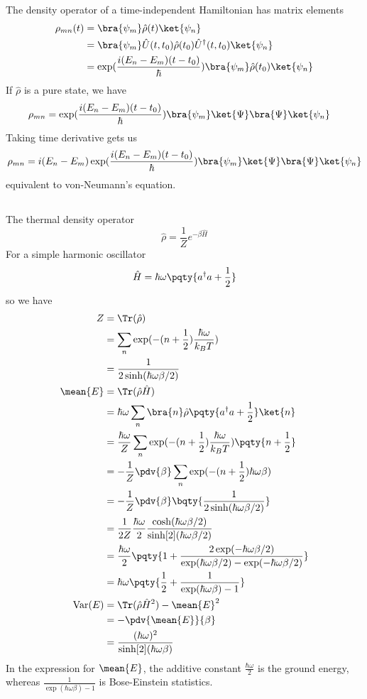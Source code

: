 \documentclass[12pt]{article}
\begin{document}
\subsection{} The density operator of a time-independent Hamiltonian has matrix elements
\begin{align*}
    \rho_{mn}(t)&= \bra{\psi_m} \hat{\rho} (t) \ket{\psi_n}  \\
    &= \bra{\psi_m} \hat{U}(t,t_0)\hat{\rho}(t_0)\hat{U}^\dagger(t,t_0)\ket{\psi_n}\\ 
    &= \exp(\frac{i(E_n -E_m)(t - t_0)}{\hbar})\bra{\psi_m} \hat{\rho}(t_0)\ket{\psi_n}
\end{align*}
If \(\hat{\rho} \) is a pure state, we have \begin{align*}
    \rho_{mn} &= \exp(\frac{i(E_n -E_m)(t - t_0)}{\hbar})\bra{\psi_m} \ket{\Psi }\bra{\Psi} \ket{\psi_n}
\end{align*}
Taking time derivative gets us \[
    \rho_{mn} = i(E_n -E_m)\exp(\frac{i(E_n -E_m)(t - t_0)}{\hbar})\bra{\psi_m} \ket{\Psi }\bra{\Psi} \ket{\psi_n}
\]
equivalent to von-Neumann's equation.
\subsection{} The thermal density operator \[
    \hat{\rho}  = \frac{1}{Z} e^{ - \beta \hat{H}}
\]
For a simple harmonic oscillator \[
    \hat{H} = \hbar\omega \pqty{a^\dagger a + \frac{1}{2}}
\]
so we have \begin{align*}
    Z &= \Tr(\hat{\rho})\\
    &= \sum_n \exp( -(n + \frac{1}{2})\frac{\hbar\omega}{k_BT} )\\
    &= \frac{1}{2\sinh(\hbar\omega \beta /2)}\\
    \mean{E} &=  \Tr(\hat{\rho}\hat{H})\\
    &=  \hbar\omega \sum_n \bra{n} \hat{\rho}\pqty{a^\dagger a + \frac{1}{2}} \ket{n} \\
    &=  \frac{\hbar\omega}{Z} \sum_n \exp( -(n + \frac{1}{2})\frac{\hbar\omega}{k_BT} )\pqty{n + \frac{1}{2}}\\
    &=  -\frac{1}{Z} \pdv{\beta} \sum_n \exp( -(n + \frac{1}{2})\hbar\omega \beta  )\\
    &=  -\frac{1}{Z} \pdv{\beta}\bqty{\frac{1}{2\sinh(\hbar\omega \beta /2)}}\\
    &=  \frac{1}{2Z} \frac{\hbar\omega}{2} \frac{\cosh(\hbar\omega \beta /2)}{\sinh[2](\hbar\omega \beta /2) }\\
    &=\frac{\hbar\omega}{2} \pqty{1 +\frac{ 2\exp( -\hbar\omega\beta /2)}{\exp(\hbar\omega\beta /2) - \exp( -\hbar\omega\beta /2)} }\\
    &={\hbar\omega} \pqty{\frac{1}{2} +\frac{ 1}{\exp(\hbar\omega\beta) - 1} }\\
    \operatorname{Var}(E) &= \Tr(\hat{\rho} \hat{H}^2) - \mean{E}^2\\
    &= -\pdv{\mean{E}}{\beta}\\
    &= \frac{(\hbar\omega)^2}{\sinh[2](\hbar\omega\beta)}
\end{align*}
In the expression for \(\mean{E}\), the additive constant \(\frac{\hbar \omega}{2} \) is the ground energy, whereas \(\frac{ 1}{\exp(\hbar\omega\beta) - 1}\) is Bose-Einstein statistics.
\newpage
\end{document}
